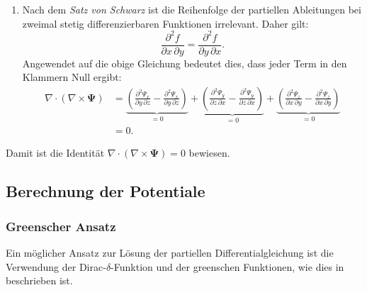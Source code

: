\begin{enumerate}
    \item Nach dem \emph{Satz von Schwarz} ist die Reihenfolge der
    partiellen Ableitungen bei zweimal stetig differenzierbaren
    Funktionen irrelevant.
    Daher gilt:
    \[
    \frac{\partial^2 f}{\partial x\, \partial y} = \frac{\partial^2 f}{\partial y\, \partial x}.
    \]
    Angewendet auf die obige Gleichung bedeutet dies, dass jeder
    Term in den Klammern Null ergibt:
    \begin{align*}
    \nabla \cdot (\nabla \times \boldsymbol{\Psi})
&=
\underbrace{\left( \frac{\partial^2 \Psi_x}{\partial y\, \partial z} - \frac{\partial^2 \Psi_x}{\partial y\, \partial z} \right)}_{\displaystyle=0}
+
\underbrace{\left( \frac{\partial^2 \Psi_y}{\partial z\, \partial x} - \frac{\partial^2 \Psi_y}{\partial z\, \partial x} \right)}_{\displaystyle=0}
+
\underbrace{\left( \frac{\partial^2 \Psi_z}{\partial x\, \partial y} - \frac{\partial^2 \Psi_z}{\partial x\, \partial y} \right)}_{\displaystyle=0} \\
    &= 0.
    \end{align*}
\end{enumerate}
Damit ist die Identität $\nabla \cdot (\nabla \times \boldsymbol{\Psi})
= 0$ bewiesen.

\subsection{Berechnung der Potentiale
\label{helmholtz:subsection:Berechnung der Potentiale}}

\subsubsection{Greenscher Ansatz}
Ein möglicher Ansatz zur Lösung der partiellen Differentialgleichung
ist die Verwendung der Dirac-$\delta$-Funktion und der
greenschen Funktionen,
%
wie dies in \cite{baird_helmholtz} beschrieben ist.

